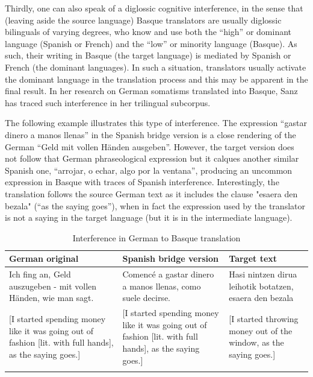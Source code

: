 \documentclass[output=paper]{LSP/langsci}
\begin{document}
Thirdly, one can also speak of a diglossic cognitive interference, in the sense that (leaving aside the source language) Basque translators are usually diglossic bilinguals of varying degrees, who know and use both the “high” or dominant language (Spanish or French) and the “low” or minority language (Basque). As such, their writing in Basque (the target language) is mediated by Spanish or French (the dominant languages). In such a situation, translators usually activate the dominant language in the translation process and this may be apparent in the final result. In her research on German somatisms translated into Basque, Sanz has traced such interference in her trilingual subcorpus.

The following example illustrates this type of interference. The expression “gastar dinero a manos llenas” in the Spanish bridge version is a close rendering of the German “Geld mit  vollen Händen ausgeben”. However, the target version does not follow that German phraseological expression but it calques another similar Spanish one, “arrojar, o echar, algo por la ventana”, producing an uncommon expression in Basque with traces of Spanish interference. Interestingly, the translation follows the source German text as it includes the clause "esaera den bezala" (“as the saying goes”), when in fact the expression used by the translator is not a saying in the target language (but it is in the intermediate language).

\begin{table}
     \centering
     \begin{tabularx}{\textwidth}{XXX}
     \lsptoprule
German original    & Spanish bridge version  & Target text  \\ 
\midrule
Ich fing an, Geld auszugeben - mit vollen Händen, wie man sagt.   &  Comencé a gastar dinero a manos llenas, como suele decirse.   &  Hasi nintzen dirua leihotik botatzen, esaera den bezala  \\ 
{[}I started spending money like it was going out of fashion {[}lit. with full hands{]}, as the saying goes.{]} & {[}I started spending money like it was going out of fashion {[}lit. with full hands{]}, as the saying goes.{]}  & {[}I started throwing money out of the window, as the saying goes.{]}  \\

     \lspbottomrule
     \end{tabularx}

 \caption{Interference in German to Basque translation}
     \label{tab:3.1}
\end{table}
\end{document}
